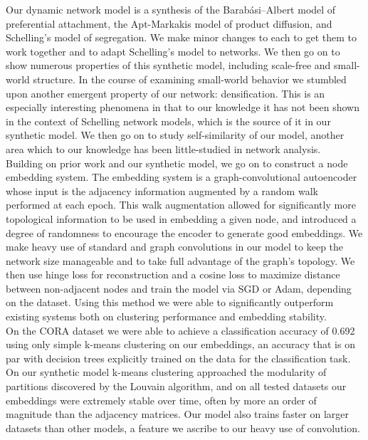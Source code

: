 \documentclass[12pt,twoside]{report}
\begin{document}
Our dynamic network model is a synthesis of the Barabási–Albert model of preferential attachment, the Apt-Markakis model of product diffusion, and Schelling's model of segregation. We make minor changes to each to get them to work together and to adapt Schelling's model to networks. We then go on to show numerous properties of this synthetic model, including scale-free and small-world structure. In the course of examining small-world behavior we stumbled upon another emergent property of our network: densification. This is an especially interesting phenomena in that to our knowledge it has not been shown in the context of Schelling network models, which is the source of it in our synthetic model. We then go on to study self-similarity of our model, another area which to our knowledge has been little-studied in network analysis. \\

Building on prior work and our synthetic model, we go on to construct a node embedding system. The embedding system is a graph-convolutional autoencoder whose input is the adjacency information augmented by a random walk performed at each epoch. This walk augmentation allowed for significantly more topological information to be used in embedding a given node, and introduced a degree of randomness to encourage the encoder to generate good embeddings. We make heavy use of standard and graph convolutions in our model to keep the network size manageable and to take full advantage of the graph's topology. We then use hinge loss for reconstruction and a cosine loss to maximize distance between non-adjacent nodes and train the model via SGD or Adam, depending on the dataset. Using this method we were able to significantly outperform existing systems both on clustering performance and embedding stability. \\

On the CORA dataset we were able to achieve a classification accuracy of 0.692 using only simple k-means clustering on our embeddings, an accuracy that is on par with decision trees explicitly trained on the data for the classification task. On our synthetic model k-means clustering approached the modularity of partitions discovered by the Louvain algorithm, and on all tested datasets our embeddings were extremely stable over time, often by more an order of magnitude than the adjacency matrices. Our model also trains faster on larger datasets than other models, a feature we ascribe to our heavy use of convolution. \\
\end{document}
